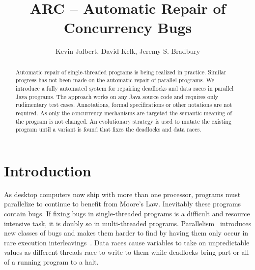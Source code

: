 \documentclass{llncs}
\begin{document}
\title{ARC -- Automatic Repair of Concurrency Bugs}

\author{Kevin Jalbert, David Kelk, Jeremy S. Bradbury}


\maketitle

\begin{abstract}

Automatic repair of single-threaded programs is being realized in practice.
Similar progress has not been made on the automatic repair of parallel
programs. We introduce a fully automated system for repairing
deadlocks and data races in parallel Java programs. The approach works on any
Java source code and requires only rudimentary test cases. Annotations, formal
specifications or other notations are not required. As only the concurrency
mechanisms are targeted the semantic meaning of the program is not changed.
An evolutionary strategy is used to mutate the existing program
until a variant is found that fixes the deadlocks and data races.

\end{abstract}

\section{Introduction}
\label{sec:introduction}

As desktop computers now ship with more than one processor, programs must
parallelize to continue to benefit from Moore's Law. Inevitably these programs
contain bugs. If fixing bugs in single-threaded programs is a difficult and
resource intensive task,  it is doubly so in multi-threaded programs.
Parallelism~\cite{SL05} introduces new classes of bugs and makes them harder to
find by having them only occur in rare execution interleavings~\cite{MQB07}.
Data races cause variables to take on unpredictable values as different threads
race to write to them while deadlocks bring part or all of a running program to
a halt.
\end{document}
